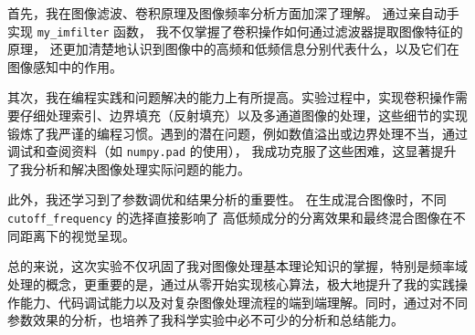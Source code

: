 首先，我在图像滤波、卷积原理及图像频率分析方面加深了理解。
通过亲自动手实现 \texttt{my\_imfilter} 函数，
我不仅掌握了卷积操作如何通过滤波器提取图像特征的原理，
还更加清楚地认识到图像中的高频和低频信息分别代表什么，以及它们在图像感知中的作用。

其次，我在编程实践和问题解决的能力上有所提高。实验过程中，实现卷积操作需要仔细处理索引、边界填充（反射填充）以及多通道图像的处理，这些细节的实现锻炼了我严谨的编程习惯。遇到的潜在问题，例如数值溢出或边界处理不当，通过调试和查阅资料（如 \texttt{numpy.pad} 的使用），
我成功克服了这些困难，这显著提升了我分析和解决图像处理实际问题的能力。

此外，我还学习到了参数调优和结果分析的重要性。
在生成混合图像时，不同\texttt{cutoff\_frequency} 的选择直接影响了
高低频成分的分离效果和最终混合图像在不同距离下的视觉呈现。

总的来说，这次实验不仅巩固了我对图像处理基本理论知识的掌握，特别是频率域处理的概念，更重要的是，通过从零开始实现核心算法，极大地提升了我的实践操作能力、代码调试能力以及对复杂图像处理流程的端到端理解。同时，通过对不同参数效果的分析，也培养了我科学实验中必不可少的分析和总结能力。
